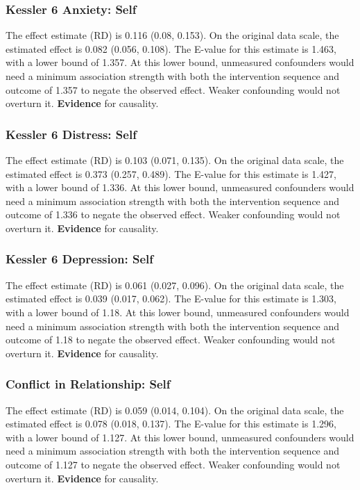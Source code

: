 \documentclass[
  singlecolumn]{article}
\begin{document}
\subsubsection{Kessler 6 Anxiety: Self}\label{kessler-6-anxiety-self-2}

The effect estimate (RD) is 0.116 (0.08, 0.153). On the original data
scale, the estimated effect is 0.082 (0.056, 0.108). The E-value for
this estimate is 1.463, with a lower bound of 1.357. At this lower
bound, unmeasured confounders would need a minimum association strength
with both the intervention sequence and outcome of 1.357 to negate the
observed effect. Weaker confounding would not overturn it.
\textbf{Evidence} for causality.

\subsubsection{Kessler 6 Distress:
Self}\label{kessler-6-distress-self-2}

The effect estimate (RD) is 0.103 (0.071, 0.135). On the original data
scale, the estimated effect is 0.373 (0.257, 0.489). The E-value for
this estimate is 1.427, with a lower bound of 1.336. At this lower
bound, unmeasured confounders would need a minimum association strength
with both the intervention sequence and outcome of 1.336 to negate the
observed effect. Weaker confounding would not overturn it.
\textbf{Evidence} for causality.

\subsubsection{Kessler 6 Depression:
Self}\label{kessler-6-depression-self-2}

The effect estimate (RD) is 0.061 (0.027, 0.096). On the original data
scale, the estimated effect is 0.039 (0.017, 0.062). The E-value for
this estimate is 1.303, with a lower bound of 1.18. At this lower bound,
unmeasured confounders would need a minimum association strength with
both the intervention sequence and outcome of 1.18 to negate the
observed effect. Weaker confounding would not overturn it.
\textbf{Evidence} for causality.

\subsubsection{Conflict in Relationship:
Self}\label{conflict-in-relationship-self-2}

The effect estimate (RD) is 0.059 (0.014, 0.104). On the original data
scale, the estimated effect is 0.078 (0.018, 0.137). The E-value for
this estimate is 1.296, with a lower bound of 1.127. At this lower
bound, unmeasured confounders would need a minimum association strength
with both the intervention sequence and outcome of 1.127 to negate the
observed effect. Weaker confounding would not overturn it.
\textbf{Evidence} for causality.
\end{document}
